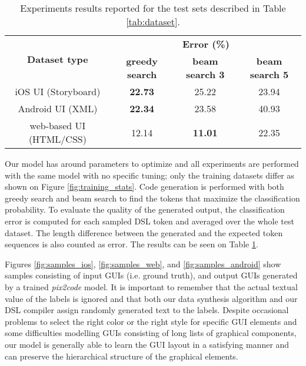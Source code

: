 \documentclass{article}
\begin{document}
\begin{table}[H]
    \caption{Experiments results reported for the test sets described in Table \ref{tab:dataset}.}
    \centering
    \begin{tabular}{| c | c | c | c |} \hline
        \multirow{2}{*}{\textbf{Dataset type}} &
        \multicolumn{3}{c|}{\textbf{Error (\%)}} \\ \cline{2-4}
        & \textbf{greedy search} & \textbf{beam search 3} & \textbf{beam search 5}\\ \hline
        iOS UI (Storyboard) & \textbf{22.73} & 25.22 & 23.94 \\ \hline
        Android UI (XML) & \textbf{22.34} & 23.58 & 40.93 \\ \hline
        web-based UI (HTML/CSS) & 12.14 & \textbf{11.01} & 22.35 \\ \hline
    \end{tabular}
    \label{tab:experiments}
\end{table}

Our model has around  parameters to optimize and all experiments are performed with the same model with no specific tuning; only the training datasets differ as shown on Figure \ref{fig:training_stats}. Code generation is performed with both greedy search and beam search to find the tokens that maximize the classification probability. To evaluate the quality of the generated output, the classification error is computed for each sampled DSL token and averaged over the whole test dataset. The length difference between the generated and the expected token sequences is also counted as error. The results can be seen on Table \ref{tab:experiments}.

Figures \ref{fig:samples_ios}, \ref{fig:samples_web}, and \ref{fig:samples_android} show samples consisting of input GUIs (i.e. ground truth), and output GUIs generated by a trained \emph{pix2code} model. It is important to remember that the actual textual value of the labels is ignored and that both our data synthesis algorithm and our DSL compiler assign randomly generated text to the labels. Despite occasional problems to select the right color or the right style for specific GUI elements and some difficulties modelling GUIs consisting of long lists of graphical components, our model is generally able to learn the GUI layout in a satisfying manner and can preserve the hierarchical structure of the graphical elements.
\end{document}
